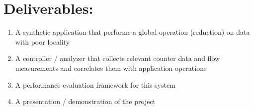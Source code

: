 \documentclass[12pt]{article}
\begin{document}
\section*{Deliverables:}
\label{deriverables}
\begin{enumerate}
\item A synthetic application that performs a global operation (reduction) on data with poor locality
\item A controller / analyzer that collects relevant counter data and flow measurements and correlates them with application operations
\item A performance evaluation framework for this system
\item A presentation / demonstration of the project
\end{enumerate}



%
%
\end{document}
